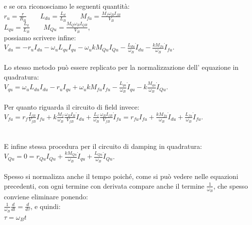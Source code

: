 \documentclass[Lau,noexaminfo]{sapthesis}
\begin{document}
	 e se ora riconosciamo le seguenti quantità:\\
	 $r_u=\frac{r}{R_B} \qquad L_{du}=\frac{L_d}{L_B} \qquad M_{fu}=\frac{M_f\omega_B I_{fB}}{V_B}$\\
	 $L_{qu}=\frac{L_q}{L_B} \qquad M_{Qu}=\frac{M_Q \omega_B I_{QB}}{V_B} $,\\
	 possiamo scrivere infine:\\
	 $V_{du}=-r_uI_{du}-\omega_u L_{qu} I_{qu} -\omega_ukM_{Qu} I_{Qu} -\frac{L_{du}}{\omega_B}\dot{I}_{du}-\frac{kM_{fu}}{\omega_B}\dot{I}_{fu}$.\\\\
	 Lo stesso metodo può essere replicato per la normalizzazione dell' equazione in quadratura:\\
	 $V_{qu}=\omega_u L_{du}I_{du}-r_u I_{qu}+\omega_ukM_{fu}I_{fu}-\frac{L_{qu}}{\omega_B}\dot{I}_{qu}-k\frac{M_{qu}}{\omega_B}\dot{I}_{Qu}$.\\\\
	 Per quanto riguarda il circuito di field invece:\\
	 $V_{fu}=r_f\frac{I_{fB}}{V_{fB}}I_{fu}+k\frac{M_f}{\omega_B}\frac{\omega_BI_B}{V_{fB}}\dot{I}_{du}+\frac{L_f}{\omega_B}\frac{\omega_BI_{fB}}{V_{fB}}\dot{I}_{fu}=r_{fu}I_{fu}+\frac{kM_{fu}}{\omega_B}\dot{I}_{du}+\frac{L_{fu}}{\omega_B}\dot{I}_{fu}$.\\\\\\
	 E infine stessa procedura per il circuito di damping in quadratura:\\
	 $V_{Qu}=0=r_{Qu}I_{Qu}+\frac{kM_{Qu}}{\omega_B}\dot{I}_{qu}+\frac{L_{Qu}}{\omega_B}\dot{I}_{Qu}$.\\\\
	 Spesso si normalizza anche il tempo poiché, come si può vedere nelle equazioni precedenti, con ogni termine con derivata compare anche il termine $\frac{1}{\omega_B}$, che spesso conviene eliminare ponendo:\\
	 $\frac{1}{\omega_B}\frac{d}{dt}=\frac{d}{d\tau}$, e quindi:\\
	 $\tau=\omega_Bt$
\end{document}
